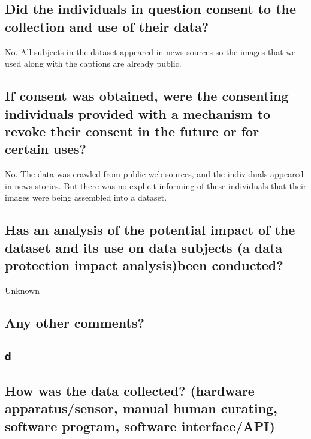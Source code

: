 \subsection*{Did the individuals in question consent to the collection and use of their data?}

\noindent No. All subjects in the dataset appeared in news sources so the
images that we used along with the captions are already public.

\subsection*{If consent was obtained, were the consenting individuals provided with a mechanism to revoke their consent in the future or for certain uses?}
\noindent No. The data was crawled from public web sources, and the individuals appeared in news stories. But there was no explicit informing of these individuals that their images were being assembled into a dataset.

\subsection*{Has an analysis of the potential impact of the dataset and its use on data subjects (\eg a data protection impact analysis)been conducted?}
\noindent Unknown

\subsection*{Any other comments?}
\noindent 

\subsection*{\texttt{d}}
\noindent 

\subsection*{How was the data collected? (\eg hardware apparatus/sensor, manual human curating, software program, software interface/API)}
\noindent


